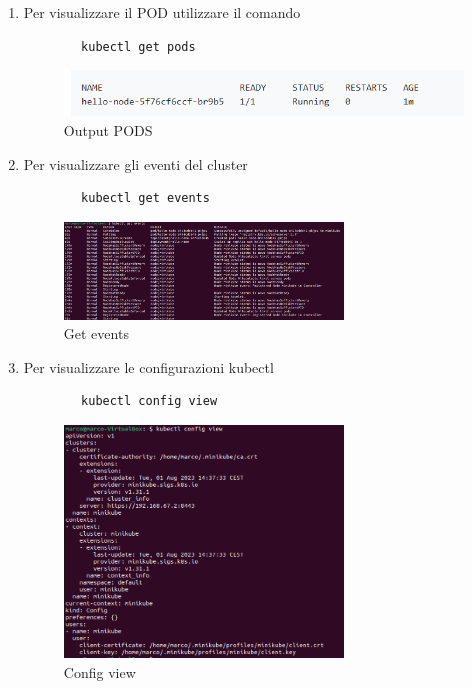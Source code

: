 \documentclass{article}
\begin{document}
\begin{enumerate}
    \item Per visualizzare il POD utilizzare il comando
    \begin{lstlisting}
        kubectl get pods
    \end{lstlisting}
    \begin{figure}[h]
        \centering
\includegraphics{images/output_pods.png}
        \caption{Output PODS}
        \label{fig:output_pods}
    \end{figure}
    \item Per visualizzare gli eventi del cluster
    \begin{lstlisting}
        kubectl get events
    \end{lstlisting}
      \begin{figure}[h]
        \centering
\includegraphics[width=0.7\textwidth]{images/get_events.png}
        \caption{Get events}
        \label{fig:get_events}
    \end{figure}
    \item Per visualizzare le configurazioni kubectl    \begin{lstlisting}
        kubectl config view
    \end{lstlisting}
     \begin{figure}[h]
        \centering
\includegraphics[width=0.7\textwidth]{images/get_config_view.png}
        \caption{Config view}
        \label{fig:config_view}
    \end{figure}
\end{enumerate}
\end{document}
